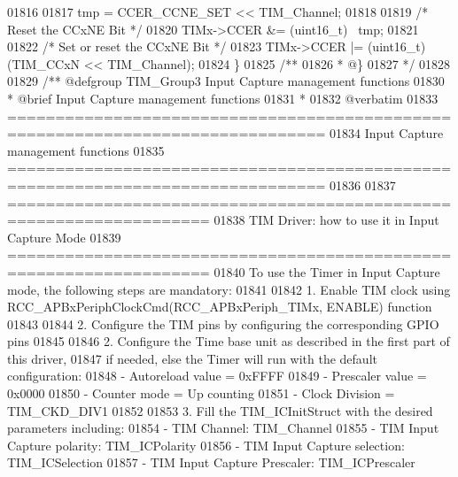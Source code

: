 \begin{DoxyCode}
01816 
01817   tmp = CCER_CCNE_SET << TIM\_Channel;
01818 
01819   \textcolor{comment}{/* Reset the CCxNE Bit */}
01820   TIMx->CCER &= (uint16\_t) ~tmp;
01821 
01822   \textcolor{comment}{/* Set or reset the CCxNE Bit */}
01823   TIMx->CCER |=  (uint16\_t)(TIM\_CCxN << TIM\_Channel);
01824 \}
01825 \textcolor{comment}{/**}
01826 \textcolor{comment}{  * @\}}
01827 \textcolor{comment}{  */}
01828 
01829 \textcolor{comment}{/** @defgroup TIM\_Group3 Input Capture management functions}
01830 \textcolor{comment}{ *  @brief    Input Capture management functions }
01831 \textcolor{comment}{ *}
01832 \textcolor{comment}{@verbatim   }
01833 \textcolor{comment}{ ===============================================================================}
01834 \textcolor{comment}{                      Input Capture management functions}
01835 \textcolor{comment}{ ===============================================================================  }
01836 \textcolor{comment}{   }
01837 \textcolor{comment}{       ===================================================================      }
01838 \textcolor{comment}{              TIM Driver: how to use it in Input Capture Mode}
01839 \textcolor{comment}{       =================================================================== }
01840 \textcolor{comment}{       To use the Timer in Input Capture mode, the following steps are mandatory:}
01841 \textcolor{comment}{       }
01842 \textcolor{comment}{       1. Enable TIM clock using RCC\_APBxPeriphClockCmd(RCC\_APBxPeriph\_TIMx, ENABLE) function}
01843 \textcolor{comment}{       }
01844 \textcolor{comment}{       2. Configure the TIM pins by configuring the corresponding GPIO pins}
01845 \textcolor{comment}{       }
01846 \textcolor{comment}{       2. Configure the Time base unit as described in the first part of this driver,}
01847 \textcolor{comment}{          if needed, else the Timer will run with the default configuration:}
01848 \textcolor{comment}{          - Autoreload value = 0xFFFF}
01849 \textcolor{comment}{          - Prescaler value = 0x0000}
01850 \textcolor{comment}{          - Counter mode = Up counting}
01851 \textcolor{comment}{          - Clock Division = TIM\_CKD\_DIV1}
01852 \textcolor{comment}{          }
01853 \textcolor{comment}{       3. Fill the TIM\_ICInitStruct with the desired parameters including:}
01854 \textcolor{comment}{          - TIM Channel: TIM\_Channel}
01855 \textcolor{comment}{          - TIM Input Capture polarity: TIM\_ICPolarity}
01856 \textcolor{comment}{          - TIM Input Capture selection: TIM\_ICSelection}
01857 \textcolor{comment}{          - TIM Input Capture Prescaler: TIM\_ICPrescaler}

\end{DoxyCode}
